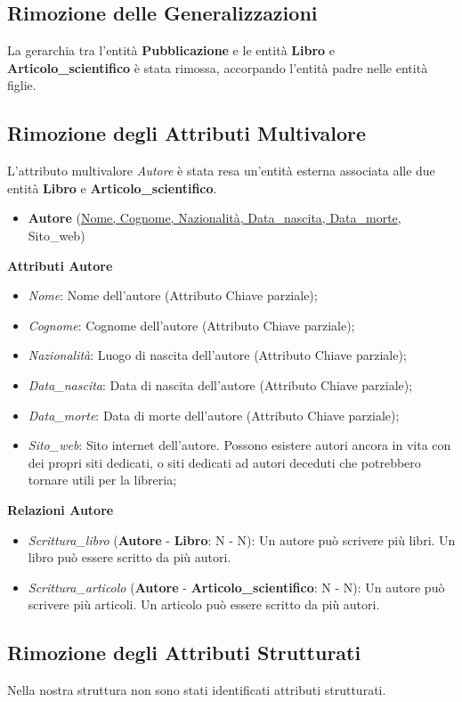 \documentclass[a4paper, 15pt, oneside]{article}
\begin{document}
	\subsection{Rimozione delle Generalizzazioni}
	La gerarchia tra l'entità \textbf{Pubblicazione} e le entità \textbf{Libro} e \textbf{Articolo\_scientifico} è stata rimossa, accorpando l'entità padre nelle entità figlie.
	\subsection{Rimozione degli Attributi Multivalore}
	L'attributo multivalore \textit{Autore} è stata resa un'entità esterna associata alle due entità \textbf{Libro} e \textbf{Articolo\_scientifico}.
	\begin{itemize}
		\item \textbf{Autore} (\underline{Nome, Cognome, Nazionalità, Data\_nascita, Data\_morte}, Sito\_web)
	\end{itemize}
	\textbf{Attributi Autore}
	\begin{itemize}
		\item \textit{Nome}: Nome dell'autore (Attributo Chiave parziale);
		\item \textit{Cognome}: Cognome dell'autore (Attributo Chiave parziale);
		\item \textit{Nazionalità}: Luogo di nascita dell'autore (Attributo Chiave parziale);
		\item \textit{Data\_nascita}: Data di nascita dell'autore (Attributo Chiave parziale);
		\item \textit{Data\_morte}: Data di morte dell'autore (Attributo Chiave parziale);
		\item \textit{Sito\_web}: Sito internet dell'autore. Possono esistere autori ancora in vita con dei propri siti dedicati, o siti dedicati ad autori deceduti che potrebbero tornare utili per la libreria;
	\end{itemize}
	\textbf{Relazioni Autore}
	\begin{itemize}
			\item \textit{Scrittura\_libro} (\textbf{Autore} - \textbf{Libro}: N - N): Un autore può scrivere più libri. Un libro può essere scritto da più autori.
			\item \textit{Scrittura\_articolo} (\textbf{Autore} - \textbf{Articolo\_scientifico}: N - N): Un autore può scrivere più articoli. Un articolo può essere scritto da più autori.
	\end{itemize}
	\subsection{Rimozione degli Attributi Strutturati}
	Nella nostra struttura non sono stati identificati attributi strutturati.
\end{document}
